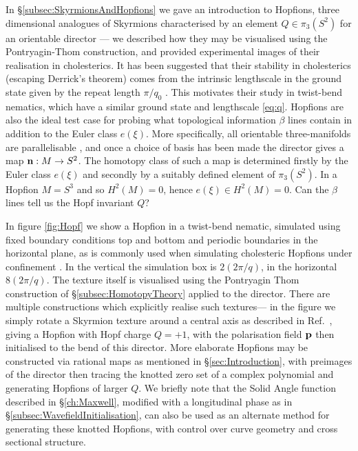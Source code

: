 {In \S\ref{subsec:SkyrmionsAndHopfions} we gave an introduction to Hopfions, three dimensional analogues of Skyrmions characterised by an element $Q\in \pi_3(S^2)$ for an orientable director --- we described how they may be visualised using the Pontryagin-Thom construction, and provided experimental images of their realisation in cholesterics. It has been suggested that their stability in cholesterics (escaping Derrick's theorem) comes from the intrinsic lengthscale in the ground state given by the repeat length $\pi/q_0$ \citep{Ackerman2017}. This motivates their study in twist-bend nematics, which have a similar ground state and lengthscale \eqref{eq:q}. Hopfions are also the ideal test case for probing what topological information $\beta$ lines contain in addition to the Euler class $e(\xi)$. More specifically, all orientable three-manifolds are parallelisable \citep{Geiges2009}, and once a choice of basis has been made the director gives a map $\mathbf{n} :M\rightarrow S^2$. The homotopy class of such a map is determined firstly by the Euler class $e(\xi)$ and secondly by a suitably defined element of $\pi_3(S^2)$. In a Hopfion $M=S^3$ and so $H^2(M)=0$, hence $e(\xi)\in H^2(M)=0$. Can the $\beta$ lines tell us the Hopf invariant $Q$?

In figure \ref{fig:Hopf} we show a Hopfion in a twist-bend nematic, simulated using fixed boundary conditions top and bottom and periodic boundaries in the horizontal plane, as is commonly used when simulating cholesteric Hopfions under confinement \citep{Ackerman2017}. In the vertical the simulation box is $2(2\pi/q)$, in the horizontal $8(2\pi/q)$. The texture itself is visualised using the Pontryagin Thom construction of \S\ref{subsec:HomotopyTheory} applied to the director. There are multiple constructions which explicitly realise such textures--- in the figure we simply rotate a Skyrmion texture around a central axis as described in Ref.~\citep{Sutcliffe2007}, giving a Hopfion with Hopf charge $Q=+1$, with the polarisation field $\mathbf{p}$  then initialised to the bend of this director. More elaborate Hopfions may be constructed via rational maps \citep{Sutcliffe2007} as mentioned in \S\ref{sec:Introduction}, with preimages of the director then tracing the knotted zero set of a complex polynomial and generating Hopfions of larger $Q$. We briefly note that the Solid Angle function described in \S\ref{ch:Maxwell}, modified with a longitudinal phase as in \S\ref{subsec:WavefieldInitialisation}, can also be used as an alternate method for generating these knotted Hopfions, with control over curve geometry and cross sectional structure. 

}
